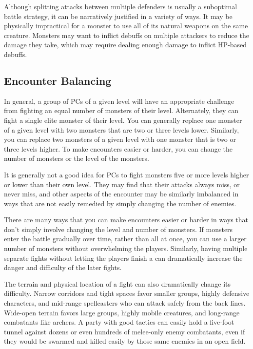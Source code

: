             Although splitting attacks between multiple defenders is usually a suboptimal battle strategy, it can be narratively justified in a variety of ways.
            It may be physically impractical for a monster to use all of its natural weapons on the same creature.
            Monsters may want to inflict debuffs on multiple attackers to reduce the damage they take, which may require dealing enough damage to inflict HP-based debuffs.

    \subsection{Encounter Balancing}\label{Encounter Balancing}
        In general, a group of PCs of a given level will have an appropriate challenge from fighting an equal number of monsters of their level.
        Alternately, they can fight a single elite monster of their level.
        You can generally replace one monster of a given level with two monsters that are two or three levels lower.
        Similarly, you can replace two monsters of a given level with one monster that is two or three levels higher.
        To make encounters easier or harder, you can change the number of monsters or the level of the monsters.

        It is generally not a good idea for PCs to fight monsters five or more levels higher or lower than their own level.
        They may find that their attacks always miss, or never miss, and other aspects of the encounter may be similarly imbalanced in ways that are not easily remedied by simply changing the number of enemies.

        There are many ways that you can make encounters easier or harder in ways that don't simply involve changing the level and number of monsters.
        If monsters enter the battle gradually over time, rather than all at once, you can use a larger number of monsters without overwhelming the players.
        Similarly, having multiple separate fights without letting the players finish a  can dramatically increase the danger and difficulty of the later fights.

        The terrain and physical location of a fight can also dramatically change its difficulty.
        Narrow corridors and tight spaces favor smaller groups, highly defensive characters, and mid-range spellcasters who can attack safely from the back lines.
        Wide-open terrain favors large groups, highly mobile creatures, and long-range combatants like archers.
        A party with good tactics can easily hold a five-foot tunnel against dozens or even hundreds of melee-only enemy combatants, even if they would be swarmed and killed easily by those same enemies in an open field.

